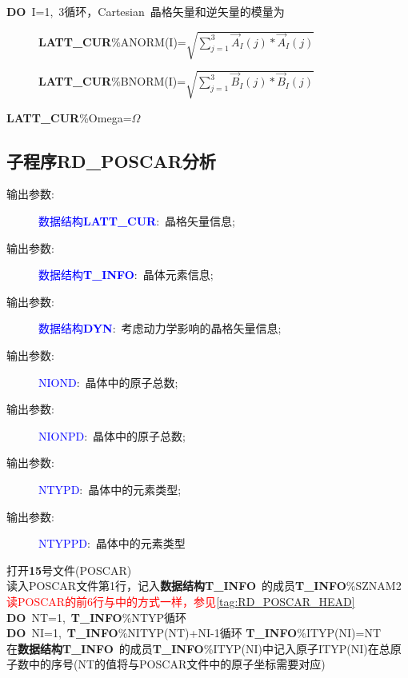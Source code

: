 \documentclass{article}      %
\begin{document}
\noindent\textbf{DO}~\textrm{I}=1,~3循环，\textrm{Cartesian~}晶格矢量和逆矢量的模量为
\begin{description}
	\item[]\textbf{LATT\_CUR}\%\textrm{ANORM}(I)=$\sqrt{\sum\limits_{j=1}^3\vec A_I(j)*\vec A_I(j)}$
	\item[]\textbf{LATT\_CUR}\%\textrm{BNORM}(I)=$\sqrt{\sum\limits_{j=1}^3\vec B_I(j)*\vec B_I(j)}$
\end{description}
\textbf{LATT\_CUR}\%\textrm{Omega}=$\Omega$

\subsection{子程序\bf{RD\_POSCAR}分析}
\begin{description}
	\item[输出参数:~]\textcolor{blue}{数据结构\textbf{LATT\_CUR}}:~晶格矢量信息;
	\item[输出参数:~]\textcolor{blue}{数据结构\textbf{T\_INFO}}:~晶体元素信息;
	\item[输出参数:~]\textcolor{blue}{数据结构\textbf{DYN}}:~考虑动力学影响的晶格矢量信息;
	\item[输出参数:~]\textcolor{blue}{\textrm{NIOND}}:~晶体中的原子总数;
	\item[输出参数:~]\textcolor{blue}{\textrm{NIONPD}}:~晶体中的原子总数;
	\item[输出参数:~]\textcolor{blue}{\textrm{NTYPD}}:~晶体中的元素类型;
	\item[输出参数:~]\textcolor{blue}{\textrm{NTYPPD}}:~晶体中的元素类型
\end{description}
打开\textbf{15}号文件(\textrm{POSCAR})\\
读入\textrm{POSCAR}文件第1行，记入\textbf{数据结构T\_INFO}~的成员\textbf{T\_INFO}\%\textrm{SZNAM2}\\
\textcolor{red}{读\textrm{POSCAR}的前6行与中的方式一样，参见\ref{tag:RD_POSCAR_HEAD}}\\
\textbf{DO}~\textrm{NT}=1,~\textbf{T\_INFO}\%\textrm{NTYP}循环\\
\indent\textbf{DO}~\textrm{NI}=1,~\textbf{T\_INFO}\%\textrm{NITYP}(NT)+\textrm{NI}-1循环
	\indent \textbf{T\_INFO}\%\textrm{ITYP(NI)}=\textrm{NT}\\
	\indent 在\textbf{数据结构T\_INFO}~的成员\textbf{T\_INFO}\%\textrm{ITYP(NI)}中记入原子\textrm{ITYP(NI)}在总原子数中的序号(\textrm{NT}的值将与\textrm{POSCAR}文件中的原子坐标需要对应)\\
\end{document}
